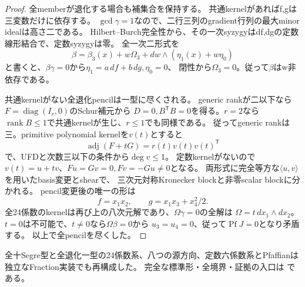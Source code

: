 \documentclass[a4paper,11pt]{ltjsarticle}
\theoremstyle{definition}
\newcommand{\rank}{\operatorname{rank}}
\begin{document}
\begin{proof}
全memberが退化する場合も補集合を保持する。
共通kernelがあればf,gは三変数だけに依存する。
$\gcd\gamma=1$なので、二行三列のgradient行列の最大minor idealは高さ二である。
Hilbert--Burch完全性から、その一次syzygyはdf,dgの定数線形結合で、定数syzygyは零。
全一次二形式を
\[
 \beta=\beta_3(x)+w\Omega_3+dw\wedge(\eta_1(x)+w\eta_0)
\]
と書くと、$\beta\gamma=0$から$\eta_1=a\,df+b\,dg,\eta_0=0$、
閉性から$\Omega_3=0$。従って$\beta$はw非依存である。

共通kernelがない全退化pencilは一型に尽くされる。
generic rankが二以下なら$F=\operatorname{diag}(I_r,0)$のSchur補元から
$D=0,B^{\mathsf T}B=0$を得る。$r=2$なら$\rank B\le1$で共通kernelが生じ、$r\le1$でも同様である。
従ってgeneric rankは三。primitive polynomial kernelを$v(t)$とすると
\[
 \operatorname{adj}(F+tG)=r(t)v(t)v(t)^{\mathsf T}
\]
で、UFDと次数三以下の条件から$\deg v\le1$。
定数kernelがないので$v(t)=u+tv$、$Fu=Gv=0,Fv=-Gu\ne0$となる。
両形式に完全等方な$\langle u,v\rangle$を用いたbasis変更とshearで、
三次元対称Kronecker blockと非零scalar blockに分かれる。
pencil変更後の唯一の形は
\[
 f=x_1x_2,\qquad g=x_1x_3+x_4^2/2.
\]
全24係数のkernelは再び上の八次元解であり、$\Omega\gamma=0$の全解は
$\Omega=t\,dx_1\wedge dx_2$。$t=0$は不可能で、$t\ne0$なら$\Omega\beta=0$から
$u_3=u_4=0$、従って$\operatorname{Pf}J=0$となり矛盾する。
以上で全pencilを尽くした。
\end{proof}
全十Segre型と全退化一型の24係数系、八つの源方向、定数六係数系とPfaffianは
独立なFraction実装でも再構成した。
完全な標準形・全境界・証拠の入口は
である。
\end{document}
